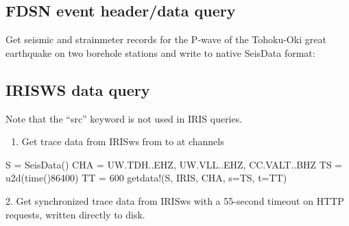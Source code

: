 \documentclass[letterpaper,11pt,english]{sphinxmanual}
\begin{document}
\subsection{FDSN event header/data query}
\label{\detokenize{src/Appendices/examples:fdsn-event-header-data-query}}
Get seismic and strainmeter records for the P-wave of the Tohoku-Oki great earthquake on two borehole stations and write to native SeisData format:

%
\begin{sphinxVerbatim}[commandchars=\\\{\}]
   
 
\end{sphinxVerbatim}


\subsection{IRISWS data query}
\label{\detokenize{src/Appendices/examples:irisws-data-query}}
Note that the “src” keyword is not used in IRIS queries.
\begin{enumerate}
\def\theenumi{\arabic{enumi}}
\def\labelenumi{\theenumi .}
\makeatletter\def\p@enumii{\p@enumi \theenumi .}\makeatother
\item {} 
Get trace data from IRISws from  to  at channels 

\end{enumerate}

%
\begin{sphinxVerbatim}[commandchars=\\\{\}]
S = SeisData()
CHA = \PYGZdq{}UW.TDH..EHZ, UW.VLL..EHZ, CC.VALT..BHZ\PYGZdq{}
TS = u2d(time()\PYGZhy{}86400)
TT = 600
get\PYGZus{}data!(S, \PYGZdq{}IRIS\PYGZdq{}, CHA, s=TS, t=TT)
\end{sphinxVerbatim}

2. Get synchronized trace data from IRISws with a 55-second timeout on HTTP requests, written directly to disk.
\end{document}
